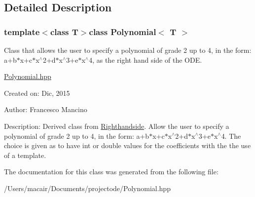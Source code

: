\subsection{Detailed Description}
\subsubsection*{template$<$class T$>$class Polynomial$<$ T $>$}

Class that allows the user to specify a polynomial of grade 2 up to 4, in the form\+: a+b$\ast$x+c$\ast$x$^\wedge$2+d$\ast$x$^\wedge$3+e$\ast$x$^\wedge$4, as the right hand side of the O\+D\+E. 

\hyperlink{_polynomial_8hpp_source}{Polynomial.\+hpp}

Created on\+: Dic, 2015 \begin{DoxyVerb}Author: Francesco Mancino
\end{DoxyVerb}


Description\+: Derived class from \hyperlink{class_righthandside}{Righthandside}. Allow the user to specify a polynomial of grade 2 up to 4, in the form\+: a+b$\ast$x+c$\ast$x$^\wedge$2+d$\ast$x$^\wedge$3+e$\ast$x$^\wedge$4. The choice is given as to have int or double values for the coefficients with the the use of a template. 

The documentation for this class was generated from the following file\+:\begin{DoxyCompactItemize}
\item 
/\+Users/macair/\+Documents/projectode/Polynomial.\+hpp\end{DoxyCompactItemize}

